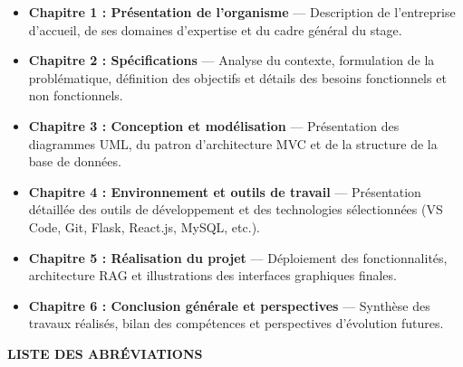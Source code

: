 \documentclass[12pt, a4paper, oneside]{report}
\begin{document}
\begin{itemize}
  \item \textbf{Chapitre 1 : Présentation de l’organisme} — Description de l'entreprise d'accueil, de ses domaines d’expertise et du cadre général du stage.
  \item \textbf{Chapitre 2 : Spécifications} — Analyse du contexte, formulation de la problématique, définition des objectifs et détails des besoins fonctionnels et non fonctionnels.
  \item \textbf{Chapitre 3 : Conception et modélisation} — Présentation des diagrammes UML, du patron d'architecture MVC et de la structure de la base de données.
  \item \textbf{Chapitre 4 : Environnement et outils de travail} — Présentation détaillée des outils de développement et des technologies sélectionnées (VS Code, Git, Flask, React.js, MySQL, etc.).
  \item \textbf{Chapitre 5 : Réalisation du projet} — Déploiement des fonctionnalités, architecture RAG et illustrations des interfaces graphiques finales.
  \item \textbf{Chapitre 6 : Conclusion générale et perspectives} — Synthèse des travaux réalisés, bilan des compétences et perspectives d'évolution futures.
\end{itemize}

\newpage

\tableofcontents
\newpage

\vspace*{0.5cm}
\begin{center}
  {\Huge \textbf{LISTE DES ABRÉVIATIONS}}
\end{center}
\vspace{0.8cm}
\end{document}
